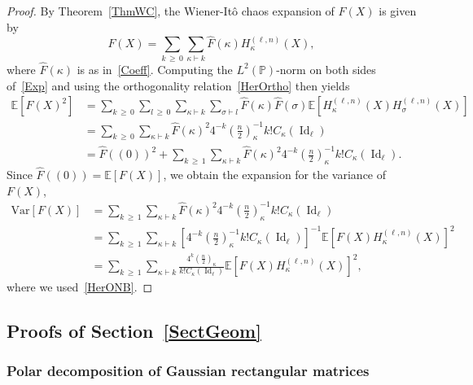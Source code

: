 \documentclass[AHL,Unicode,longabstracts,published]{cedram}
\DeclareMathOperator{\Id}{Id}
\newcommand{\Prob}{\mathbb{P}}
\newcommand{\E}[1]{\mathbb{E}\left[#1\right]}
\newcommand{\V}[1]{\mathrm{Var}{\left[#1\right]}}
\begin{document}
\begin{proof}
By Theorem~\ref{ThmWC}, the Wiener-Itô chaos expansion of $F(X)$ is given by
\begin{equation}\label{Exp}
F(X) = \sum_{k\,\geq\,0} \sum_{\kappa\vdash k} \widehat{F}(\kappa) H_{\kappa}^{(\ell,n)}(X),
\end{equation}
where $\widehat{F}(\kappa)$ is as in~\eqref{Coeff}. Computing the $L^2(\Prob)$-norm on both sides of~\eqref{Exp} and using the orthogonality relation~\eqref{HerOrtho} then yields
\begin{align*}
\E{F(X)^2} &= \sum_{k\,\geq\,0} \sum_{l\,\geq\,0}\sum_{\kappa \vdash k}
\sum_{\sigma \vdash l}
\widehat{F}(\kappa)
\widehat{F}(\sigma)
\E{H_{\kappa}^{(\ell,n)}(X) H_{\sigma}^{(\ell,n)}(X)} \\
&= \sum_{k\,\geq\,0}\sum_{\kappa \vdash k}
\widehat{F}(\kappa)^2 4^{-k}\left(\frac{n}{2}\right)_{\kappa}^{-1} k !C_{\kappa}(\Id_{\ell}) \\
&= \widehat{F}((0))^2 + \sum_{k\,\geq\,1} \sum_{\kappa\vdash k}
\widehat{F}(\kappa)^2 4^{-k}\left(\frac{n}{2}\right)_{\kappa}^{-1} k!C_{\kappa}(\Id_{\ell}).
\end{align*}
Since $\widehat{F}((0))=\E{F(X)}$, we obtain the expansion for the variance of $F(X)$,
\begin{align*}
\V{F(X)} &= \sum_{k\,\geq\,1}\sum_{\kappa\vdash k}
\widehat{F}(\kappa)^2 4^{-k}\left(\frac{n}{2}\right)_{\kappa}^{-1} k!C_{\kappa}(\Id_{\ell}) \\
&= \sum_{k\,\geq\,1}\sum_{\kappa \vdash k}
\left[4^{-k}\left(\frac{n}{2}\right)_{\kappa}^{-1} k!C_{\kappa}(\Id_{\ell}) \right]^{-1} \E{F(X) H_{\kappa}^{(\ell,n)}(X)}^2 \\
&= \sum_{k\,\geq\,1}\sum_{\kappa \vdash k}
\frac{4^{k}\left(\frac{n}{2}\right)_{\kappa}}{k!C_{\kappa}(\Id_{\ell}) }
\E{F(X) H_{\kappa}^{(\ell,n)}(X)}^2,
\end{align*}
where we used~\eqref{HerONB}.
\end{proof}

\subsection{Proofs of Section~\ref{SectGeom}}
\subsubsection*{Polar decomposition of Gaussian rectangular matrices}
\end{document}
